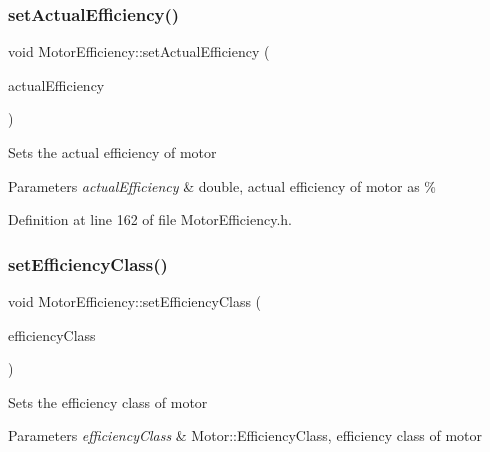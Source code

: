 \mbox{\label{class_motor_efficiency_a7a5ad8d01fdc0a3bf93d952752487496}} 
\subsubsection{\texorpdfstring{set\+Actual\+Efficiency()}{setActualEfficiency()}\hspace{0.1cm}{\footnotesize\ttfamily [3/3]}}
{\footnotesize\ttfamily void Motor\+Efficiency\+::set\+Actual\+Efficiency (\begin{DoxyParamCaption}\item[{double}]{actual\+Efficiency }\end{DoxyParamCaption})\hspace{0.3cm}{\ttfamily [inline]}}

Sets the actual efficiency of motor 
\begin{DoxyParams}{Parameters}
{\em actual\+Efficiency} & double, actual efficiency of motor as \% \\
\hline
\end{DoxyParams}


Definition at line 162 of file Motor\+Efficiency.\+h.

\mbox{\label{class_motor_efficiency_a1ff4790d01bf2e65bd7bce2edc98d0c5}} 
\subsubsection{\texorpdfstring{set\+Efficiency\+Class()}{setEfficiencyClass()}\hspace{0.1cm}{\footnotesize\ttfamily [1/3]}}
{\footnotesize\ttfamily void Motor\+Efficiency\+::set\+Efficiency\+Class (\begin{DoxyParamCaption}\item[{Motor\+::\+Efficiency\+Class}]{efficiency\+Class }\end{DoxyParamCaption})\hspace{0.3cm}{\ttfamily [inline]}}

Sets the efficiency class of motor 
\begin{DoxyParams}{Parameters}
{\em efficiency\+Class} & Motor\+::\+Efficiency\+Class, efficiency class of motor \\
\hline
\end{DoxyParams}


